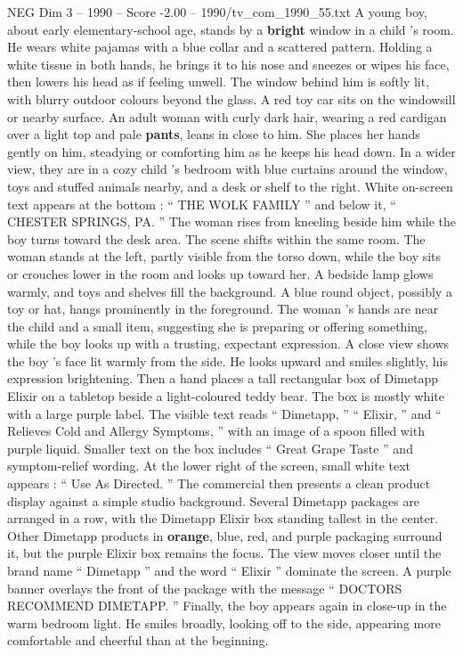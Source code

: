 \begin{textsample}{NEG Dim 3 – 1990 – Score -2.00 – 1990/tv\_com\_1990\_55.txt}  \label{ex:f3_neg_049}
A young boy, about early elementary-school age, stands by a \textbf{bright} window in a child ’s room.
He wears white pajamas with a blue collar and a scattered pattern.
Holding a white tissue in both hands, he brings it to his nose and sneezes or wipes his face, then lowers his head as if feeling unwell.
The window behind him is softly lit, with blurry outdoor colours beyond the glass.
A red toy car sits on the windowsill or nearby surface.
An adult woman with curly dark hair, wearing a red cardigan over a light top and pale \textbf{pants}, leans in close to him.
She places her hands gently on him, steadying or comforting him as he keeps his head down.
In a wider view, they are in a cozy child ’s bedroom with blue curtains around the window, toys and stuffed animals nearby, and a desk or shelf to the right.
White on-screen text appears at the bottom : “ THE WOLK FAMILY ” and below it, “ CHESTER SPRINGS, PA. ” The woman rises from kneeling beside him while the boy turns toward the desk area.
The scene shifts within the same room.
The woman stands at the left, partly visible from the torso down, while the boy sits or crouches lower in the room and looks up toward her.
A bedside lamp glows warmly, and toys and shelves fill the background.
A blue round object, possibly a toy or hat, hangs prominently in the foreground.
The woman ’s hands are near the child and a small item, suggesting she is preparing or offering something, while the boy looks up with a trusting, expectant expression.
A close view shows the boy ’s face lit warmly from the side.
He looks upward and smiles slightly, his expression brightening.
Then a hand places a tall rectangular box of Dimetapp Elixir on a tabletop beside a light-coloured teddy bear.
The box is mostly white with a large purple label.
The visible text reads “ Dimetapp, ” “ Elixir, ” and “ Relieves Cold and Allergy Symptoms, ” with an image of a spoon filled with purple liquid.
Smaller text on the box includes “ Great Grape Taste ” and symptom-relief wording.
At the lower right of the screen, small white text appears : “ Use As Directed. ” The commercial then presents a clean product display against a simple studio background.
Several Dimetapp packages are arranged in a row, with the Dimetapp Elixir box standing tallest in the center.
Other Dimetapp products in \textbf{orange}, blue, red, and purple packaging surround it, but the purple Elixir box remains the focus.
The view moves closer until the brand name “ Dimetapp ” and the word “ Elixir ” dominate the screen.
A purple banner overlays the front of the package with the message “ DOCTORS RECOMMEND DIMETAPP. ” Finally, the boy appears again in close-up in the warm bedroom light.
He smiles broadly, looking off to the side, appearing more comfortable and cheerful than at the beginning.

\end{textsample}
